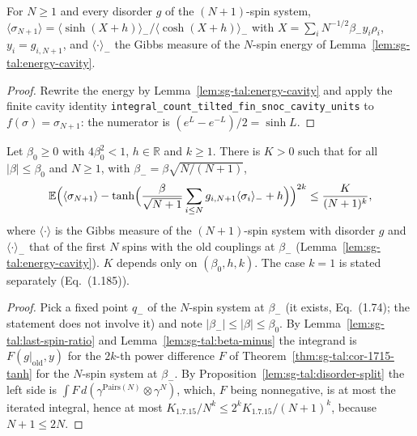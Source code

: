 \begin{lemma}
\label{lem:sg-tal:last-spin-ratio}
  \leanok
{}
For $N\ge1$ and every disorder $g$ of the $(N+1)$-spin system, $\langle\sigma_{N+1}\rangle=\langle\sinh(X+h)\rangle_-/\langle\cosh(X+h)\rangle_-$ with $X=\sum_iN^{-1/2}\beta_-y_i\rho_i$, $y_i=g_{i,N+1}$, and $\langle\cdot\rangle_-$ the Gibbs measure of the $N$-spin energy of Lemma~\ref{lem:sg-tal:energy-cavity}.
\end{lemma}
\begin{proof}
  \leanok
Rewrite the energy by Lemma~\ref{lem:sg-tal:energy-cavity} and apply the finite cavity identity \texttt{integral\_count\_tilted\_fin\_snoc\_cavity\_units} to $f(\sigma)=\sigma_{N+1}$: the numerator is $(e^L-e^{-L})/2=\sinh L$.
\end{proof}

\begin{theorem}[Lemma~1.7.4, Eq.~(1.185)]
\label{thm:sg-tal:lemma-174-a}
  \leanok
{}
Let $\beta_0\ge0$ with $4\beta_0^2<1$, $h\in\mathbb R$ and $k\ge1$.  There is $K>0$ such that for all $|\beta|\le\beta_0$ and $N\ge1$, with $\beta_-=\beta\sqrt{N/(N+1)}$,
\[
\mathbb E\Bigl(\langle\sigma_{N+1}\rangle-\tanh\Bigl(\frac{\beta}{\sqrt{N+1}}\sum_{i\le N}g_{i,N+1}\langle\sigma_i\rangle_-+h\Bigr)\Bigr)^{2k}\le\frac K{(N+1)^k},
\]
where $\langle\cdot\rangle$ is the Gibbs measure of the $(N+1)$-spin system with disorder $g$ and $\langle\cdot\rangle_-$ that of the first $N$ spins with the old couplings at $\beta_-$ (Lemma~\ref{lem:sg-tal:energy-cavity}).  $K$ depends only on $(\beta_0,h,k)$.  The case $k=1$ is stated separately (Eq.~(1.185)).
\end{theorem}
\begin{proof}
  \leanok
Pick a fixed point $q_-$ of the $N$-spin system at $\beta_-$ (it exists, Eq.~(1.74); the statement does not involve it) and note $|\beta_-|\le|\beta|\le\beta_0$.  By Lemma~\ref{lem:sg-tal:last-spin-ratio} and Lemma~\ref{lem:sg-tal:beta-minus} the integrand is $F(g|_{\mathrm{old}},y)$ for the $2k$-th power difference $F$ of Theorem~\ref{thm:sg-tal:cor-1715-tanh} for the $N$-spin system at $\beta_-$.  By Proposition~\ref{lem:sg-tal:disorder-split} the left side is $\int F\,d(\gamma^{\mathrm{Pairs}(N)}\otimes\gamma^N)$, which, $F$ being nonnegative, is at most the iterated integral, hence at most $K_{1.7.15}/N^k\le2^kK_{1.7.15}/(N+1)^k$, because $N+1\le2N$.
\end{proof}

